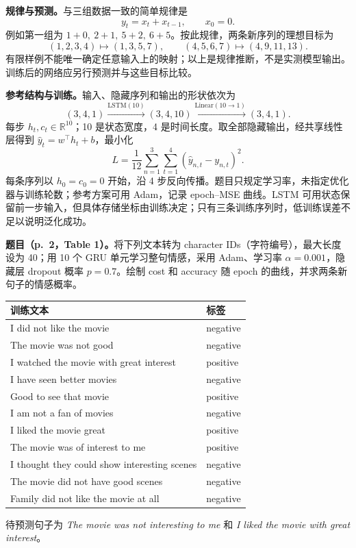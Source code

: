\textbf{规律与预测。}与三组数据一致的简单规律是
\[
 \boxed{y_t=x_t+x_{t-1},\qquad x_0=0.}
\]
例如第一组为 $1+0,\ 2+1,\ 5+2,\ 6+5$。按此规律，两条新序列的理想目标为
\[
 (1,2,3,4)\longmapsto\boxed{(1,3,5,7)},\qquad
 (4,5,6,7)\longmapsto\boxed{(4,9,11,13)}.
\]
有限样例不能唯一确定任意输入上的映射；以上是规律推断，不是实测模型输出。训练后的网络应另行预测并与这些目标比较。

\textbf{参考结构与训练。}输入、隐藏序列和输出的形状依次为
\[
 (3,4,1)\xrightarrow{\mathrm{LSTM}(10)}(3,4,10)
 \xrightarrow{\mathrm{Linear}(10\to1)}(3,4,1).
\]
每步 $h_t,c_t\in\mathbb R^{10}$；10 是状态宽度，4 是时间长度。取全部隐藏输出，经共享线性层得到 $\hat y_t=w^\top h_t+b$，最小化
\[
 L=\frac1{12}\sum_{n=1}^{3}\sum_{t=1}^{4}(\hat y_{n,t}-y_{n,t})^2.
\]
每条序列以 $h_0=c_0=0$ 开始，沿 4 步反向传播。题目只规定学习率，未指定优化器与训练轮数；参考方案可用 Adam，记录 epoch--MSE 曲线。LSTM 可用状态保留前一步输入，但具体存储坐标由训练决定；只有三条训练序列时，低训练误差不足以说明泛化成功。

\nopagebreak[4]
\textbf{题目（p.~2，Table 1）。}将下列文本转为 character IDs（字符编号），最大长度设为 40；用 10 个 GRU 单元学习整句情感，采用 Adam、学习率 $\alpha=0.001$，隐藏层 dropout 概率 $p=0.7$。绘制 cost 和 accuracy 随 epoch 的曲线，并求两条新句子的情感概率。
\begin{center}
\small
\begin{tabularx}{\textwidth}{@{}Xl@{}}
\toprule
训练文本 & 标签 \\
\midrule
I did not like the movie & negative \\
The movie was not good & negative \\
I watched the movie with great interest & positive \\
I have seen better movies & negative \\
Good to see that movie & positive \\
I am not a fan of movies & negative \\
I liked the movie great & positive \\
The movie was of interest to me & positive \\
I thought they could show interesting scenes & negative \\
The movie did not have good scenes & negative \\
Family did not like the movie at all & negative \\
\bottomrule
\end{tabularx}
\end{center}
待预测句子为 \emph{The movie was not interesting to me} 和 \emph{I liked the movie with great interest}。

